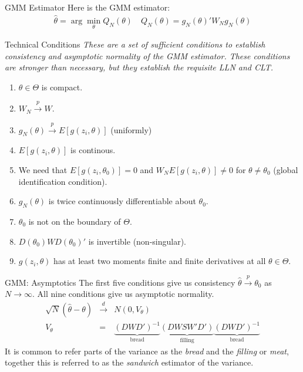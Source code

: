 \documentclass[aspectratio=169]{beamer}
\begin{document}
\begin{frame}{GMM Estimator}
Here is the GMM estimator:
\begin{eqnarray*}
\hat{\theta} = \arg \min_{\theta}  Q_N(\theta) \quad Q_N(\theta)=g_N(\theta)' W_N  g_N(\theta)
\end{eqnarray*}

\end{frame}


\begin{frame}{Technical Conditions}
\textit{These are a set of sufficient conditions to establish consistency and asymptotic normality of the GMM estimator. These conditions are stronger than necessary, but they establish the requisite LLN and CLT.}
\begin{enumerate}
\item $\theta \in \Theta$ is compact.
\item $W_N \overset{p}{\to} W$.
\item $g_N(\theta) \overset{p}{\to} E[g(z_i,\theta)]$ (uniformly)
\item $E[g(z_i,\theta)]$ is continous.
\item We need that $E[g(z_i,\theta_0)]=0$ and $W_N E[g(z_i,\theta)] \neq 0$ for $\theta \neq \theta_0$ (global identification condition).
\item $g_N(\theta)$ is twice continuously differentiable about $\theta_0$.
\item $\theta_0$ is not on the boundary of $\Theta$.
\item $D(\theta_0) W D(\theta_0)'$ is invertible (non-singular).
\item $g(z_i,\theta)$ has at least two moments finite and finite derivatives at all $\theta \in \Theta$.
\end{enumerate}
\end{frame}


\begin{frame}{GMM: Asymptotics}
The first five conditions give us consistency $\hat{\theta} \overset{p}{\to} \theta_0$ as $N \rightarrow \infty$. All nine conditions give us asymptotic normality.
\begin{eqnarray*}
\sqrt{N}(\hat{\theta}-\theta)  &\overset{d}{\to}& N(0,V_{\theta})\\
V_{\theta} &=& \underbrace{(D W D')^{-1}}_{\mbox{bread}} \underbrace{(D W S W' D')}_{\mbox{filling}}\underbrace{(D W D')^{-1}}_{\mbox{bread}} 
\end{eqnarray*}
It is common to refer parts of the variance as the \textit{bread} and the \textit{filling} or \textit{meat}, together this is referred to as the \textit{sandwich} estimator of the variance.
\end{frame}
\end{document}
